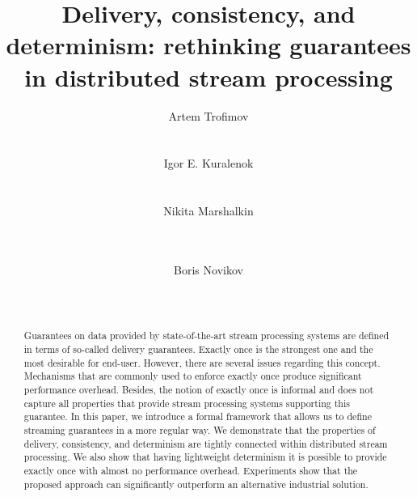 \documentclass{vldb}
\theoremstyle{definition}
\begin{document}
\title {Delivery, consistency, and determinism: rethinking guarantees in distributed stream processing}


\author{
\alignauthor
Artem Trofimov\\
       \\
       \\
\alignauthor
Igor E. Kuralenok\\
       \\
       \\
\alignauthor 
Nikita Marshalkin\\
       \\
       \\
\and  %
\alignauthor 
Boris Novikov\\
       \\
       \\
}

\maketitle

\begin{abstract}
Guarantees on data provided by state-of-the-art stream processing systems are defined in terms of so-called delivery guarantees. Exactly once is the strongest one and the most desirable for end-user. However, there are several issues regarding this concept. 
Mechanisms that are commonly used to enforce exactly once  produce  significant performance overhead. 
Besides, the notion of exactly once is informal and does not capture all properties that provide stream processing systems supporting this guarantee. 
In this paper, we introduce a formal framework that allows us to define streaming guarantees in a more regular way. We demonstrate that the properties of delivery, consistency, and determinism are tightly connected within distributed stream processing. We also show that having lightweight determinism it is possible to provide exactly once with almost no performance overhead. Experiments show that the proposed approach can significantly outperform an alternative industrial solution.
\end{abstract}
\end{document}

